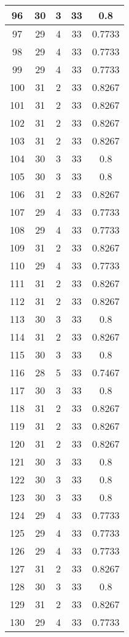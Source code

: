 \documentclass[letterpaper, 12pt]{article}
\begin{document}
\begin{longtable}{|c|c|c|c|c|}
\hline
96 & 30 & 3 & 33 & 0.8 \\
\hline
97 & 29 & 4 & 33 & 0.7733 \\
\hline
98 & 29 & 4 & 33 & 0.7733 \\
\hline
99 & 29 & 4 & 33 & 0.7733 \\
\hline
100 & 31 & 2 & 33 & 0.8267 \\
\hline
101 & 31 & 2 & 33 & 0.8267 \\
\hline
102 & 31 & 2 & 33 & 0.8267 \\
\hline
103 & 31 & 2 & 33 & 0.8267 \\
\hline
104 & 30 & 3 & 33 & 0.8 \\
\hline
105 & 30 & 3 & 33 & 0.8 \\
\hline
106 & 31 & 2 & 33 & 0.8267 \\
\hline
107 & 29 & 4 & 33 & 0.7733 \\
\hline
108 & 29 & 4 & 33 & 0.7733 \\
\hline
109 & 31 & 2 & 33 & 0.8267 \\
\hline
110 & 29 & 4 & 33 & 0.7733 \\
\hline
111 & 31 & 2 & 33 & 0.8267 \\
\hline
112 & 31 & 2 & 33 & 0.8267 \\
\hline
113 & 30 & 3 & 33 & 0.8 \\
\hline
114 & 31 & 2 & 33 & 0.8267 \\
\hline
115 & 30 & 3 & 33 & 0.8 \\
\hline
116 & 28 & 5 & 33 & 0.7467 \\
\hline
117 & 30 & 3 & 33 & 0.8 \\
\hline
118 & 31 & 2 & 33 & 0.8267 \\
\hline
119 & 31 & 2 & 33 & 0.8267 \\
\hline
120 & 31 & 2 & 33 & 0.8267 \\
\hline
121 & 30 & 3 & 33 & 0.8 \\
\hline
122 & 30 & 3 & 33 & 0.8 \\
\hline
123 & 30 & 3 & 33 & 0.8 \\
\hline
124 & 29 & 4 & 33 & 0.7733 \\
\hline
125 & 29 & 4 & 33 & 0.7733 \\
\hline
126 & 29 & 4 & 33 & 0.7733 \\
\hline
127 & 31 & 2 & 33 & 0.8267 \\
\hline
128 & 30 & 3 & 33 & 0.8 \\
\hline
129 & 31 & 2 & 33 & 0.8267 \\
\hline
130 & 29 & 4 & 33 & 0.7733 \\

\end{longtable}
\end{document}
